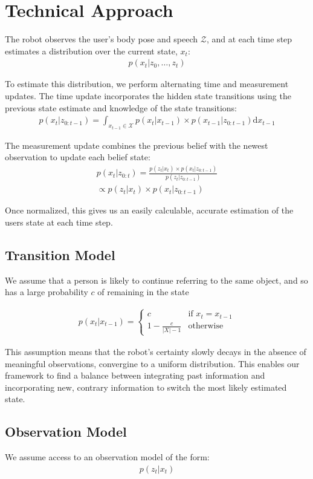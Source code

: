 \documentclass[a4paper, 11pt]{article} %
\begin{document}
\section{Technical Approach}
The robot observes the user's body pose and speech $\mathcal{Z}$, and at each time step estimates a distribution over the current state, $x_t$:
\begin{align}
p(x_t | z_0, \dots, z_t)
\end{align}

To estimate this distribution, we perform alternating time and measurement updates. The time update incorporates the hidden state transitions using the previous state estimate and knowledge of the state transitions:
\begin{align}
p(x_t | z_{0:t-1}) = \int_{x_{t-1} \in \mathcal{X}} p(x_t|x_{t-1})\times p(x_{t-1} | z_{0:t-1}) \text{d}x_{t-1}
\end{align}

The measurement update combines the previous belief with the newest observation to update each belief state: 
\begin{align}
p(x_t |z_{0:t}) = \frac{p(z_t | x_t) \times p(x_t | z_{0:t-1})}{p(z_t | z_{0:t-1})} \\\propto p(z_t | x_t) \times p(x_t | z_{0:t-1})
\end{align}

Once normalized, this gives us an easily calculable, accurate estimation of the users state at each time step.
\subsection{Transition Model}
We assume that a person is likely to continue referring to the same
object, and so has a large probability $c$ of remaining in the state

\begin{align}
p(x_t | x_{t-1}) = \left\{  \begin{array}{ll}
c&\mbox{if } x_t = x_{t-1}\\
1-\frac{c}{|X|-1}&\mbox{otherwise}
\end{array}\right.
\end{align}

This assumption means that the robot's certainty slowly decays in the absence of meaningful observations, convergine to a uniform distribution. This enables our framework to find a balance between integrating past information and incorporating new, contrary information to switch the most likely estimated state.
\subsection{Observation Model}
We assume access to an observation model of the form:
\begin{align}
p(z_t | x_t)
\end{align}
\end{document}
